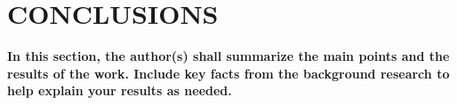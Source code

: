 
\chapter{CONCLUSIONS}

{\bf\color{red}In this section, the author(s) shall  summarize the main points and the results of the work. Include key facts from the background research to help explain your results as needed.
}


